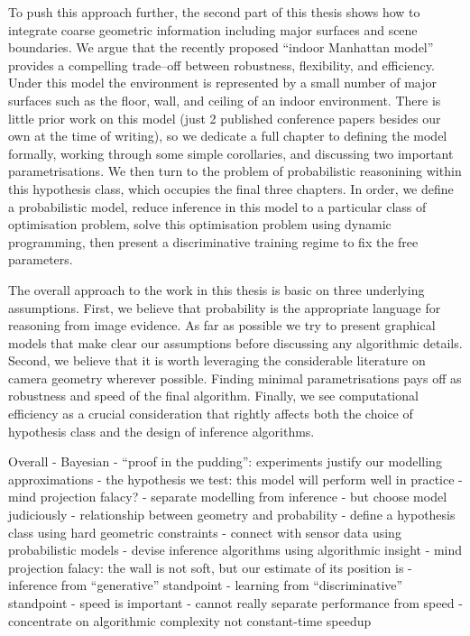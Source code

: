 To push this approach further, the second part of this thesis shows
how to integrate coarse geometric information including major surfaces
and scene boundaries. We argue that the recently proposed ``indoor
Manhattan model'' provides a compelling trade--off between robustness,
flexibility, and efficiency. Under this model the environment is
represented by a small number of major surfaces such as the floor,
wall, and ceiling of an indoor environment. There is little prior work
on this model (just 2 published conference papers besides our own at
the time of writing), so we dedicate a full chapter to defining the
model formally, working through some simple corollaries, and
discussing two important parametrisations. We then turn to the problem
of probabilistic reasonining within this hypothesis class, which
occupies the final three chapters. In order, we define a probabilistic
model, reduce inference in this model to a particular class of
optimisation problem, solve this optimisation problem using dynamic
programming, then present a discriminative training regime to fix
the free parameters.

The overall approach to the work in this thesis is basic on three
underlying assumptions. First, we believe that probability is the
appropriate language for reasoning from image evidence. As far as
possible we try to present graphical models that make clear our
assumptions before discussing any algorithmic details. Second, we
believe that it is worth leveraging the considerable literature on
camera geometry wherever possible. Finding minimal parametrisations
pays off as robustness and speed of the final algorithm. Finally, we
see computational efficiency as a crucial consideration that rightly
affects both the choice of hypothesis class and the design of
inference algorithms.

Overall
- Bayesian
- ``proof in the pudding'': experiments justify our modelling approximations
  - the hypothesis we test: this model will perform well in practice
    - mind projection falacy?
- separate modelling from inference
  - but choose model judiciously
- relationship between geometry and probability
  - define a hypothesis class using hard geometric constraints
  - connect with sensor data using probabilistic models
  - devise inference algorithms using algorithmic insight
  - mind projection falacy: the wall is not soft, but our estimate of its position is
- inference from ``generative'' standpoint
- learning from ``discriminative'' standpoint
- speed is important
  - cannot really separate performance from speed
  - concentrate on algorithmic complexity not constant-time speedup


